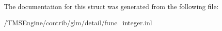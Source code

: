 The documentation for this struct was generated from the following file\+:\begin{DoxyCompactItemize}
\item 
/\+T\+M\+S\+Engine/contrib/glm/detail/\hyperlink{func__integer_8inl}{func\+\_\+integer.\+inl}\end{DoxyCompactItemize}
